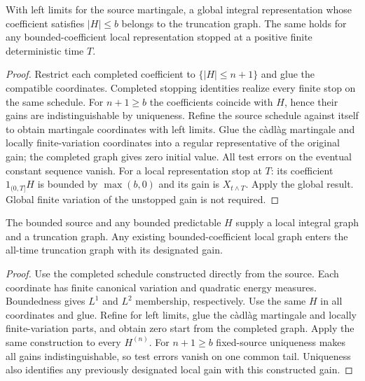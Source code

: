 \begin{proposition}
With left limits for the source martingale, a global integral representation
whose coefficient satisfies $|H|\leq b$ belongs to the truncation graph.
The same holds for any bounded-coefficient local representation stopped at a
positive finite deterministic time $T$.
\end{proposition}
\begin{proof}
Restrict each completed coefficient to $\{|H|\leq n+1\}$ and glue the
compatible coordinates. Completed stopping identities realize every finite
stop on the same schedule. For $n+1\geq b$ the coefficients coincide with
$H$, hence their gains are indistinguishable by uniqueness.
Refine the source schedule against itself to obtain martingale coordinates
with left limits. Glue the c\`adl\`ag martingale and locally finite-variation
coordinates into a regular representative of the original gain; the completed
graph gives zero initial value. All test errors on the eventual constant
sequence vanish. For a local representation stop at $T$: its coefficient
$1_{(0,T]}H$ is bounded by $\max(b,0)$ and its gain is $X_{t\wedge T}$.
Apply the global result. Global finite variation of the unstopped gain is
not required.
\end{proof}

\begin{proposition}
The bounded source and any bounded predictable $H$ supply a local integral
graph and a truncation graph. Any existing bounded-coefficient local graph
enters the all-time truncation graph with its designated gain.
\end{proposition}
\begin{proof}
Use the completed schedule constructed directly from the source. Each
coordinate has finite canonical variation and quadratic energy measures.
Boundedness gives $L^1$ and $L^2$ membership, respectively. Use the same $H$
in all coordinates and glue. Refine for left limits, glue the c\`adl\`ag
martingale and locally finite-variation parts, and obtain zero start from the
completed graph. Apply the same construction to every $H^{(n)}$.
For $n+1\geq b$ fixed-source uniqueness makes all gains indistinguishable,
so test errors vanish on one common tail. Uniqueness also identifies any
previously designated local gain with this constructed gain.
\end{proof}


